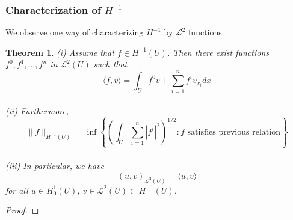 \documentclass{article}
\begin{document}
\subsubsection{Characterization of $H^{-1}$}

We observe one way of characterizing $H^{-1}$ by $\mathscr{L}^2$ functions.

\newtheorem{Th}{Theorem}
\begin{Th}
    (i) Assume that $f\in H^{-1}(U)$. Then there exist functions $f^0, f^1, \dots, f^n$ in $\mathscr{L}^2(U)$ such that 
    $$
    \langle f,v\rangle =\int_{U}f^0v+\sum\limits_{i=1}^{n}f^iv_{x_i}dx
    $$ \\
    (ii) Furthermore, 
    $$
    \|f\|_{H^{-1}(U)}=\inf\left\{\left(\int_{U}\sum\limits_{i=1}^n\left|f^i\right|^2\right)^{1/2}: f\text{ satisfies previous relation}\right\}
    $$\\
    (iii) In particular, we have 
    $$
    (u,v)_{\mathscr{L}^2(U)}=\langle u,v\rangle
    $$ for all $u\in H^{1}_{0}(U)$, $v\in\mathscr{L}^2(U)\subset H^{-1}(U)$.
\end{Th}

\begin{proof}
    
\end{proof}
\end{document}
